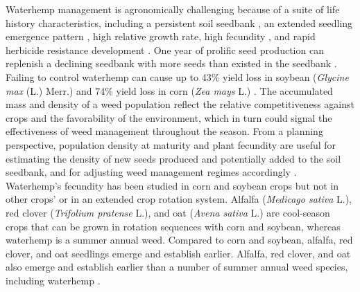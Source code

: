 \documentclass[utf8]{frontiersSCNS}
\begin{document}
Waterhemp management is agronomically challenging because of a suite of life history characteristics, including a persistent soil seedbank \citep{davisWeedSeedPools2008}, an extended seedling emergence pattern \citep{buhlerEmergencePersistenceSeed2001}, high relative growth rate, high fecundity \citep{heneghanGrowthDevelopmentFive2017}, and rapid herbicide resistance development \citep{tranelHerbicideResistanceAmaranthus2021}. One year of prolific seed production can replenish a declining seedbank with more seeds than existed in the seedbank \citep{davisWeedSeedPools2008}. Failing to control waterhemp can cause up to 43\% yield loss in soybean (\emph{Glycine max} (L.) Merr.) \citep{hagerCommonWaterhempAmaranthus2002a} and 74\% yield loss in corn (\emph{Zea mays} L.) \citep{steckelCommonWaterhempAmaranthus2004}. The accumulated mass and density of a weed population reflect the relative competitiveness against crops and the favorability of the environment, which in turn could signal the effectiveness of weed management throughout the season. From a planning perspective, population density at maturity and plant fecundity are useful for estimating the density of new seeds produced and potentially added to the soil seedbank, and for adjusting weed management regimes accordingly \citep{buhlerImplicationsWeedSeedbank1997}. Waterhemp's fecundity has been studied in corn and soybean crops \citep{menalledImpactCompostedSwine2004, nordbyInfluenceCornCommon2004} but not in other crops' or in an extended crop rotation system.
Alfalfa (\emph{Medicago sativa} L.), red clover (\emph{Trifolium pratense} L.), and oat (\emph{Avena sativa} L.) are cool-season crops that can be grown in rotation sequences with corn and soybean, whereas waterhemp is a summer annual weed. Compared to corn and soybean, alfalfa, red clover, and oat seedlings emerge and establish earlier. Alfalfa, red clover, and oat also emerge and establish earlier than a number of summer annual weed species, including waterhemp \citep{buhlerRelativeEmergenceSequence2008, horakGrowthAnalysisFour2000}.
\end{document}
